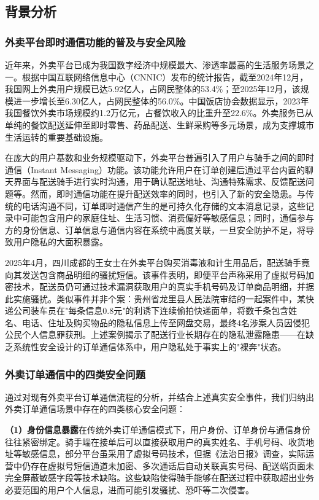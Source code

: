 \subsection{背景分析}

\subsubsection{外卖平台即时通信功能的普及与安全风险}

近年来，外卖平台已成为我国数字经济中规模最大、渗透率最高的生活服务场景之一。根据中国互联网络信息中心（CNNIC）发布的统计报告，截至2024年12月，我国网上外卖用户规模已达5.92亿人，占网民整体的53.4\%；至2025年12月，该规模进一步增长至6.30亿人，占网民整体的56.0\%。中国饭店协会数据显示，2023年我国餐饮外卖市场规模约1.2万亿元，占餐饮收入的比重升至22.6\%。外卖服务已从单纯的餐饮配送延伸至即时零售、药品配送、生鲜采购等多元场景，成为支撑城市生活运转的重要基础设施。

在庞大的用户基数和业务规模驱动下，外卖平台普遍引入了用户与骑手之间的即时通信（Instant Messaging）功能。该功能允许用户在订单创建后通过平台内置的聊天界面与配送骑手进行实时沟通，用于确认配送地址、沟通特殊需求、反馈配送问题等。然而，即时通信功能在提升配送效率的同时，也引入了新的安全隐患。与传统的电话沟通不同，订单即时通信产生的是可持久化存储的文本消息记录，这些记录中可能包含用户的家庭住址、生活习惯、消费偏好等敏感信息；同时，通信参与方的身份信息、订单信息与通信内容在系统中高度关联，一旦安全防护不足，将导致用户隐私的大面积暴露。

2025年4月，四川成都的王女士在外卖平台购买消毒液和计生用品后，配送骑手竟向其发送包含商品明细的骚扰短信。该事件表明，即便平台声称采用了虚拟号码加密技术，配送员仍可通过技术漏洞获取用户的真实手机号码及订单商品明细，并据此实施骚扰。类似事件并非个案：贵州省龙里县人民法院审结的一起案件中，某快递公司装车员在"每条信息0.8元"的利诱下连续偷拍快递面单，将数千条包含姓名、电话、住址及购买物品的隐私信息上传至网盘交易，最终4名涉案人员因侵犯公民个人信息罪获刑。上述案例揭示了配送行业长期存在的隐私泄露隐患——在缺乏系统性安全设计的订单通信体系中，用户隐私处于事实上的"裸奔"状态。

\subsubsection{外卖订单通信中的四类安全问题}

通过对现有外卖平台订单通信流程的分析，并结合上述真实安全事件，我们归纳出外卖订单通信场景中存在的四类核心安全问题：

\textbf{（1）身份信息暴露}\quad 在传统外卖订单通信模式下，用户身份、订单身份与通信身份往往紧密绑定。骑手端在接单后可以直接获取用户的真实姓名、手机号码、收货地址等敏感信息，部分平台虽采用了虚拟号码技术，但据《法治日报》调查，实际运营中仍存在虚拟号短信通道未加密、多次通话后自动关联真实号码、配送端页面未完全屏蔽敏感字段等技术缺陷。这些缺陷使得骑手能够在配送过程中获取超出业务必要范围的用户个人信息，进而可能引发骚扰、恐吓等二次侵害。

